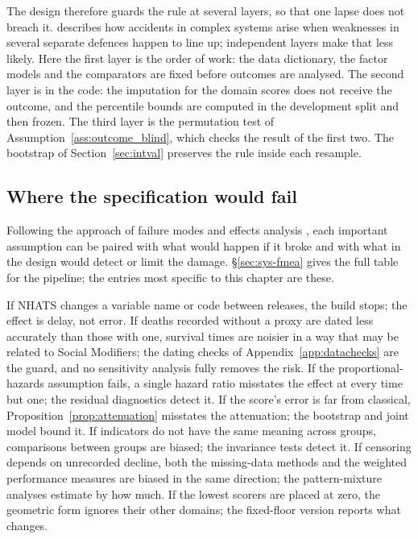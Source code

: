 The design therefore guards the rule at several layers, so that one lapse does not breach it. \citet{reason_1990} describes how accidents in complex systems arise when weaknesses in several separate defences happen to line up; independent layers make that less likely. Here the first layer is the order of work: the data dictionary, the factor models and the comparators are fixed before outcomes are analysed. The second layer is in the code: the imputation for the domain scores does not receive the outcome, and the percentile bounds are computed in the development split and then frozen. The third layer is the permutation test of Assumption~\ref{ass:outcome_blind}, which checks the result of the first two. The bootstrap of Section~\ref{sec:intval} preserves the rule inside each resample.

\subsection{Where the specification would fail}

Following the approach of failure modes and effects analysis \citep{stamatis_2003}, each important assumption can be paired with what would happen if it broke and with what in the design would detect or limit the damage. \S\ref{sec:sys-fmea} gives the full table for the pipeline; the entries most specific to this chapter are these.

If NHATS changes a variable name or code between releases, the build stops; the effect is delay, not error. If deaths recorded without a proxy are dated less accurately than those with one, survival times are noisier in a way that may be related to Social Modifiers; the dating checks of Appendix~\ref{app:datachecks} are the guard, and no sensitivity analysis fully removes the risk. If the proportional-hazards assumption fails, a single hazard ratio misstates the effect at every time but one; the residual diagnostics detect it. If the score's error is far from classical, Proposition~\ref{prop:attenuation} misstates the attenuation; the bootstrap and joint model bound it. If indicators do not have the same meaning across groups, comparisons between groups are biased; the invariance tests detect it. If censoring depends on unrecorded decline, both the missing-data methods and the weighted performance measures are biased in the same direction; the pattern-mixture analyses estimate by how much. If the lowest scorers are placed at zero, the geometric form ignores their other domains; the fixed-floor version reports what changes.

